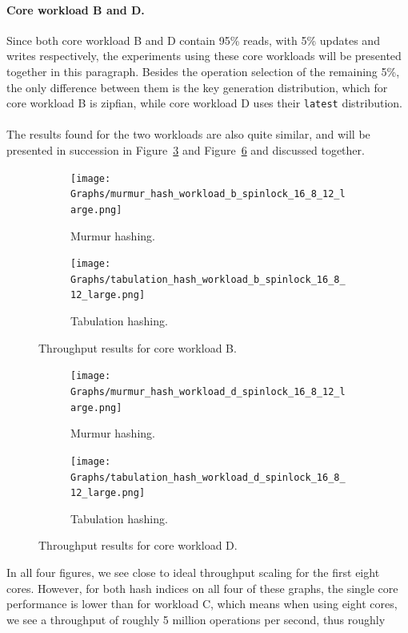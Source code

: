 \documentclass[11pt]{report} %
\begin{document}
\paragraph{Core workload B and D.} 
Since both core workload B and D contain 95\% reads, with 5\% updates and writes respectively, the experiments using these core workloads will be presented together in this paragraph. Besides the operation selection of the remaining 5\%, the only difference between them is the key generation distribution, which for core workload B is zipfian, while core workload D uses their \verb|latest| distribution.\\
\\
The results found for the two workloads are also quite similar, and will be presented in succession in Figure~\ref{fig:res_b} and Figure~\ref{fig:res_d} and discussed together.\\
\begin{figure}[H]
  \centering
  \begin{subfigure}[b]{0.45\textwidth}
    \texttt{[image: Graphs/murmur\_hash\_workload\_b\_spinlock\_16\_8\_12\_large.png]}
    \caption[]{Murmur hashing.}
    \label{fig:mur_b}
  \end{subfigure} \hfill
  \begin{subfigure}[b]{0.45\textwidth}
    \texttt{[image: Graphs/tabulation\_hash\_workload\_b\_spinlock\_16\_8\_12\_large.png]}
    \caption[]{Tabulation hashing.}
    \label{fig:tab_b}
  \end{subfigure}
  \caption[]{Throughput results for core workload B.}
  \label{fig:res_b}
\end{figure}
\begin{figure}[H]
  \centering
  \begin{subfigure}[b]{0.45\textwidth}
    \texttt{[image: Graphs/murmur\_hash\_workload\_d\_spinlock\_16\_8\_12\_large.png]}
    \caption[]{Murmur hashing.}
    \label{fig:mur_d}
  \end{subfigure} \hfill
  \begin{subfigure}[b]{0.45\textwidth}
    \texttt{[image: Graphs/tabulation\_hash\_workload\_d\_spinlock\_16\_8\_12\_large.png]}
    \caption[]{Tabulation hashing.}
    \label{fig:tab_d}
  \end{subfigure}
  \caption[]{Throughput results for core workload D.}
  \label{fig:res_d}
\end{figure}
\noindent
In all four figures, we see close to ideal throughput scaling for the first eight cores. However, for both hash indices on all four of these graphs, the single core performance is lower than for workload C, which means when using eight cores, we see a throughput of roughly 5 million operations per second, thus roughly
\end{document}
